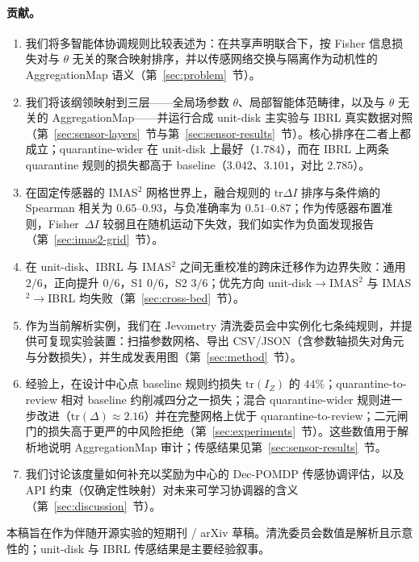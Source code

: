 \documentclass[11pt,a4paper]{article}
\begin{document}
\paragraph{贡献。}
\begin{enumerate}
  \item 我们将多智能体协调规则比较表述为：在共享声明联合下，按 Fisher 信息损失对与 $\theta$ 无关的聚合映射排序，并以传感网络交换与隔离作为动机性的 AggregationMap 语义（第~\ref{sec:problem}~节）。
  \item 我们将该纲领映射到三层——全局场参数 $\theta$、局部智能体范畴律，以及与 $\theta$ 无关的 AggregationMap——并运行合成 unit-disk 主实验与 IBRL 真实数据对照（第~\ref{sec:sensor-layers}~节与第~\ref{sec:sensor-results}~节）。核心排序在二者上都成立；quarantine-wider 在 unit-disk 上最好（$1.784$），而在 IBRL 上两条 quarantine 规则的损失都高于 baseline（$3.042$、$3.101$，对比 $2.785$）。
  \item 在固定传感器的 IMAS$^2$ 网格世界上，融合规则的 $\mathrm{tr}\Delta I$ 排序与条件熵的 Spearman 相关为 $0.65$--$0.93$，与负准确率为 $0.51$--$0.87$；作为传感器布置准则，Fisher~$\Delta I$ 较弱且在随机运动下失效，我们如实作为负面发现报告（第~\ref{sec:imas2-grid}~节）。
  \item 在 unit-disk、IBRL 与 IMAS$^2$ 之间无重校准的跨床迁移作为边界失败：通用 $2/6$，正向提升 $0/6$，S1 $0/6$，S2 $3/6$；优先方向 unit-disk$\to$IMAS$^2$ 与 IMAS$^2\to$IBRL 均失败（第~\ref{sec:cross-bed}~节）。
  \item 作为当前解析实例，我们在 Jevometry 清洗委员会中实例化七条纯规则，并提供可复现实验装置：扫描参数网格、导出 CSV/JSON（含参数轴损失对角元与分数损失），并生成发表用图（第~\ref{sec:method}~节）。
  \item 经验上，在设计中心点 baseline 规则约损失 $\mathrm{tr}(I_Z)$ 的 $44\%$；quarantine-to-review 相对 baseline 约削减四分之一损失；混合 quarantine-wider 规则进一步改进（$\mathrm{tr}(\Delta)\approx 2.16$）并在完整网格上优于 quarantine-to-review；二元闸门的损失高于更严的中风险拒绝（第~\ref{sec:experiments}~节）。这些数值用于解析地说明 AggregationMap 审计；传感结果见第~\ref{sec:sensor-results}~节。
  \item 我们讨论该度量如何补充以奖励为中心的 Dec-POMDP 传感协调评估，以及 API 约束（仅确定性映射）对未来可学习协调器的含义（第~\ref{sec:discussion}~节）。
\end{enumerate}

本稿旨在作为伴随开源实验的短期刊 / arXiv 草稿。清洗委员会数值是解析且示意性的；unit-disk 与 IBRL 传感结果是主要经验叙事。
\end{document}
